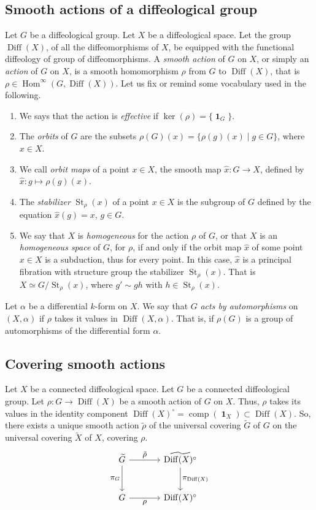 \documentclass[10pt,reqno,twoside]{amsart}
\DeclareMathOperator{\id}{\mathbf{1}}
\DeclareMathOperator{\Diff}{Diff}
\DeclareMathOperator{\Hom}{Hom}
\DeclareMathOperator{\Stab}{St}
\DeclareMathOperator{\comp}{comp}
\theoremstyle{plain}
\theoremstyle{definition}
\newcommand{\article}[1]{\subsection{#1}}
\begin{document}
  \article{Smooth actions of a diffeological group}
  \label{Smooth-actions-of-a-diffeological-group}
  Let $G$ be a diffeological group.
  Let $X$ be a diffeological space.
  Let the group $\Diff(X)$,
  of all the diffeomorphisms of $X$,
  be equipped with the functional diffeology of group of diffeomorphisms.
  A {\em smooth action} of $G$ on $X$,
  or simply an {\em action} of $G$ on $X$,
  is a smooth homomorphism $\rho$ from $G$ to $\Diff(X)$,
  that is $\rho \in \Hom^\infty(G, \Diff(X))$.
  Let us fix or remind some vocabulary used in the following.
  \begin{enumerate}
    \item We says that the action is {\em effective} if $\ker(\rho) = \{\id_G\}$.
    \item The {\em orbits} of $G$ are the subsets $\rho(G)(x) = \{ \rho(g)(x) \mid g \in G \}$, where $x \in X$.
    \item We call {\em orbit maps} of a point $x \in X$, the smooth map $\hat x : G \to X$, defined by $\hat x : g \mapsto \rho(g)(x)$.
    \item The {\em stabilizer} $\Stab_\rho(x)$ of a point $x \in X$ is the subgroup of $G$ defined by the equation $\hat x(g) = x$, $g \in G$.
    \item We say that $X$ is {\em homogeneous} for the action $\rho$ of $G$, or that $X$ is an {\em homogeneous space} of $G$, for $\rho$, if and only if the orbit map $\hat x$ of some point $x \in X$ is a subduction, thus for every point. In this case, $\hat x$ is a principal fibration \cite{Igl85} with structure group the stabilizer $\Stab_\rho(x)$. That is $X \simeq G /\Stab_\rho(x)$, where $g' \sim g h$ with $h \in \Stab_\rho(x)$.
  \end{enumerate}
  Let $\alpha$ be a differential $k$-form on $X$.
  We say that $G$ {\em acts by automorphisms} on $(X, \alpha)$ if $\rho$ takes it values in $\Diff(X,\alpha)$.
  That is,
  if $\rho(G)$ is a group of automorphisms of the differential form $\alpha$.
  
  \article{Covering smooth actions}
  \label{Covering-smooth-actions}
  Let $X$ be a connected diffeological space.
  Let $G$ be a connected diffeological group.
  Let $\rho : G \to \Diff(X)$ be a smooth action of $G$ on $X$.
  Thus,
  $\rho$ takes its values in the identity component $\Diff(X)^\circ = \comp(\id_X) \subset \Diff(X)$.
  So,
  there exists a unique smooth action $\tilde \rho$ of the universal covering $\tilde G$ of $G$ on the universal covering $\tilde X$ of $X$,
  covering $\rho$.
  \[
  \begin{tikzcd}[column sep=large, row sep=large, every label/.append style = {font = \small}]
    \widetilde{G} \arrow[r, "\tilde{\rho}"] \arrow[d, "\pi_G"'] & \widetilde{\Diff(X)^\circ} \arrow[d, "\pi_{\Diff(X)}"] \\
    G \arrow[r, "\rho"'] & \Diff(X)^\circ
  \end{tikzcd}
  \]
  
\end{document}
